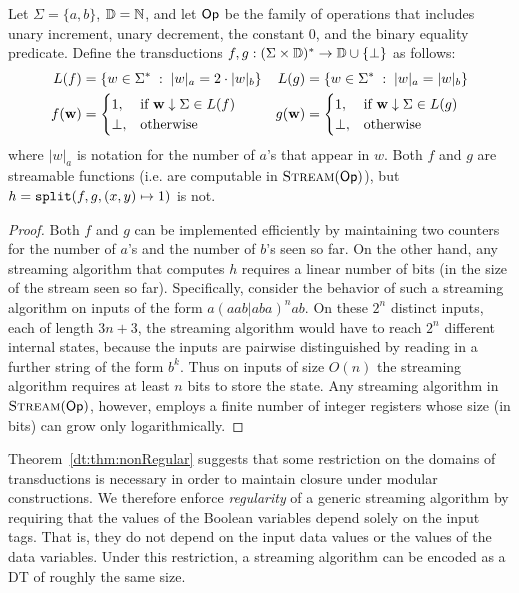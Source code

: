\begin{theorem}
\label{dt:thm:nonRegular}
Let $\Sigma = \{a,b\}$, $\mathbb{D} = \mathbb{N}$, and let $\textsf{Op}$ be the family of operations that includes unary increment, unary decrement, the constant $0$, and the binary equality predicate. Define the transductions $f, g: (\Sigma \times \mathbb{D})^{*} \to \mathbb{D} \cup \{\bot\}$ as follows:
\begin{align*}
L(f) &= \{ w \in \Sigma^{*} \;:\; |w|_a = 2 \cdot |w|_b \}
&
L(g) &= \{ w \in \Sigma^{*} \;:\; |w|_a = |w|_b \}
\\
f(\mathbf{w}) &= \begin{cases}
  1, &\text{if $\mathbf{w} \downarrow \Sigma \in L(f)$} \\
  \bot, &\text{otherwise}
\end{cases}
&
g(\mathbf{w}) &= \begin{cases}
  1, &\text{if $\mathbf{w} \downarrow \Sigma \in L(g)$} \\
  \bot, &\text{otherwise}
\end{cases}
\end{align*}
where $|w|_a$ is notation for the number of $a$'s that appear in $w$. Both $f$ and $g$ are streamable functions (i.e. are computable in $\textsc{Stream}(\textsf{Op})$), but $h = \texttt{split}(f, g, (x,y) \mapsto 1)$ is not.
\end{theorem}
\begin{proof}[Proof]
Both $f$ and $g$ can be implemented efficiently by maintaining two counters for the number of $a$'s and the number of $b$'s seen so far.
On the other hand, any streaming algorithm that computes $h$ requires a linear number of bits (in the size of the stream seen so far). Specifically, consider the behavior of such a streaming algorithm on inputs of the form $a(aab | aba)^n ab$. On these $2^n$ distinct inputs, each of length $3n+3$, the streaming algorithm would have to reach $2^n$ different internal states, because the inputs are pairwise distinguished by reading in a further string of the form $b^k$. Thus on inputs of size $O(n)$ the streaming algorithm requires at least $n$ bits to store the state.
Any streaming algorithm in $\textsc{Stream}(\textsf{Op})$, however, employs a finite number of integer registers whose size (in bits) can grow only logarithmically.
\end{proof}

Theorem~\ref{dt:thm:nonRegular} suggests that some restriction on the domains of transductions is necessary in order to maintain closure under modular constructions. We therefore enforce \emph{regularity} of a generic streaming algorithm by requiring that the values of the Boolean variables depend solely on the input tags. That is, they do not depend on the input data values or the values of the data variables. Under this restriction, a streaming algorithm can be encoded as a DT of roughly the same size.

